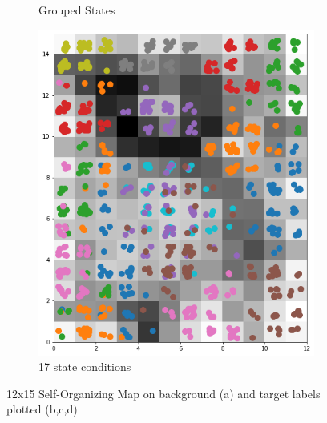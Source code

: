 \documentclass[twocolumn]{article}
\begin{document}
\begin{figure}
\begin{subfigure}{0.245\textwidth}
            \caption{Grouped States}
            \label{fig:som4}
      \end{subfigure}
      \begin{subfigure}{0.245\textwidth}
            \centering
            \includegraphics[width=\textwidth]{som_17.png}
            \caption{17 state conditions}
            \label{fig:som17}
      \end{subfigure}

      \caption{12x15 Self-Organizing Map on background (a) and target labels plotted (b,c,d)\newline}
      \label{fig:som}


\end{figure}
\end{document}
